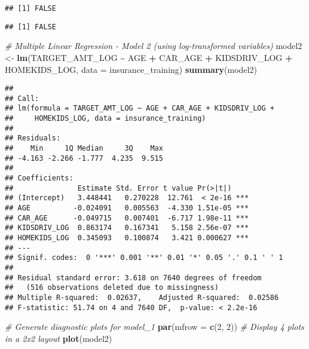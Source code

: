 \documentclass[
]{article}
\newenvironment{Shaded}{\begin{snugshade}}{\end{snugshade}}
\newcommand{\AttributeTok}[1]{\textcolor[rgb]{0.13,0.29,0.53}{#1}}
\newcommand{\CommentTok}[1]{\textcolor[rgb]{0.56,0.35,0.01}{\textit{#1}}}
\newcommand{\DecValTok}[1]{\textcolor[rgb]{0.00,0.00,0.81}{#1}}
\newcommand{\FunctionTok}[1]{\textcolor[rgb]{0.13,0.29,0.53}{\textbf{#1}}}
\newcommand{\NormalTok}[1]{#1}
\newcommand{\OtherTok}[1]{\textcolor[rgb]{0.56,0.35,0.01}{#1}}
\newcommand{\SpecialCharTok}[1]{\textcolor[rgb]{0.81,0.36,0.00}{\textbf{#1}}}
\begin{document}
\begin{verbatim}
## [1] FALSE
\end{verbatim}

\begin{Shaded}
\end{Shaded}

\begin{verbatim}
## [1] FALSE
\end{verbatim}

\begin{Shaded}
\begin{Highlighting}[]
\CommentTok{\# Multiple Linear Regression {-} Model 2 (using log{-}transformed variables)}
\NormalTok{model2 }\OtherTok{\textless{}{-}} \FunctionTok{lm}\NormalTok{(TARGET\_AMT\_LOG }\SpecialCharTok{\textasciitilde{}}\NormalTok{ AGE }\SpecialCharTok{+}\NormalTok{ CAR\_AGE }\SpecialCharTok{+}\NormalTok{ KIDSDRIV\_LOG }\SpecialCharTok{+}\NormalTok{ HOMEKIDS\_LOG, }
             \AttributeTok{data =}\NormalTok{ insurance\_training)}
\FunctionTok{summary}\NormalTok{(model2)}
\end{Highlighting}
\end{Shaded}

\begin{verbatim}
## 
## Call:
## lm(formula = TARGET_AMT_LOG ~ AGE + CAR_AGE + KIDSDRIV_LOG + 
##     HOMEKIDS_LOG, data = insurance_training)
## 
## Residuals:
##    Min     1Q Median     3Q    Max 
## -4.163 -2.266 -1.777  4.235  9.515 
## 
## Coefficients:
##               Estimate Std. Error t value Pr(>|t|)    
## (Intercept)   3.448441   0.270228  12.761  < 2e-16 ***
## AGE          -0.024091   0.005563  -4.330 1.51e-05 ***
## CAR_AGE      -0.049715   0.007401  -6.717 1.98e-11 ***
## KIDSDRIV_LOG  0.863174   0.167341   5.158 2.56e-07 ***
## HOMEKIDS_LOG  0.345093   0.100874   3.421 0.000627 ***
## ---
## Signif. codes:  0 '***' 0.001 '**' 0.01 '*' 0.05 '.' 0.1 ' ' 1
## 
## Residual standard error: 3.618 on 7640 degrees of freedom
##   (516 observations deleted due to missingness)
## Multiple R-squared:  0.02637,    Adjusted R-squared:  0.02586 
## F-statistic: 51.74 on 4 and 7640 DF,  p-value: < 2.2e-16
\end{verbatim}

\begin{Shaded}
\begin{Highlighting}[]
\CommentTok{\# Generate diagnostic plots for model\_1}
\FunctionTok{par}\NormalTok{(}\AttributeTok{mfrow =} \FunctionTok{c}\NormalTok{(}\DecValTok{2}\NormalTok{, }\DecValTok{2}\NormalTok{))  }\CommentTok{\# Display 4 plots in a 2x2 layout}
\FunctionTok{plot}\NormalTok{(model2)}
\end{Highlighting}
\end{Shaded}
\end{document}
